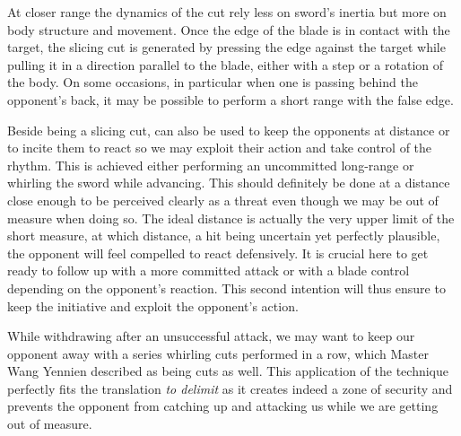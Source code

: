 At closer range the dynamics of the \Hua{} cut rely less on sword's inertia but more on body structure and movement. Once the edge of the blade is in contact with the target, the slicing cut is generated by pressing the edge against the target while pulling it in a direction parallel to the blade, either with a step or a rotation of the body. On some occasions, in particular when one is passing behind the opponent's back, it may be possible to perform a short range \Hua{} with the false edge. 

Beside being a slicing cut, \Hua{} can also be used to keep the opponents at distance or to incite them to react so we may exploit their action and take control of the rhythm. This is achieved either performing an uncommitted long-range \Hua{} or whirling the sword while advancing. This should definitely be done at a distance close enough to be perceived clearly as a threat even though we may be out of measure when doing so. The ideal distance is actually the very upper limit of the short measure, at which distance, a hit being uncertain yet perfectly plausible, the opponent will feel compelled to react defensively. It is crucial here to get ready to follow up with a more committed attack or with a blade control depending on the opponent's reaction. This second intention will thus ensure to keep the initiative and exploit the opponent's action.


While withdrawing after an unsuccessful attack, we may want to keep our opponent away with a series whirling cuts performed in a row, which Master Wang Yennien described as being \Hua{} cuts as well. This application of the technique perfectly fits the translation \textit{to delimit} as it creates indeed a zone of security and prevents the opponent from catching up and attacking us while we are getting out of measure. 


